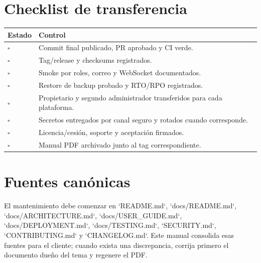 \section{Checklist de transferencia}

\begin{tabularx}{\textwidth}{@{}L{0.08\textwidth}Y@{}}
\toprule
\textbf{Estado} & \textbf{Control}\\
\midrule
$\square$ & Commit final publicado, PR aprobado y CI verde.\\
$\square$ & Tag/release y checksums registrados.\\
$\square$ & Smoke por roles, correo y WebSocket documentados.\\
$\square$ & Restore de backup probado y RTO/RPO registrados.\\
$\square$ & Propietario y segundo administrador transferidos para cada plataforma.\\
$\square$ & Secretos entregados por canal seguro y rotados cuando corresponde.\\
$\square$ & Licencia/cesión, soporte y aceptación firmados.\\
$\square$ & Manual PDF archivado junto al tag correspondiente.\\
\bottomrule
\end{tabularx}

\section{Fuentes canónicas}

El mantenimiento debe comenzar en `README.md`, `docs/README.md`, `docs/ARCHITECTURE.md`,
`docs/USER\_GUIDE.md`, `docs/DEPLOYMENT.md`, `docs/TESTING.md`, `SECURITY.md`,
`CONTRIBUTING.md` y `CHANGELOG.md`. Este manual consolida esas fuentes para el cliente; cuando
exista una discrepancia, corrija primero el documento dueño del tema y regenere el PDF.

